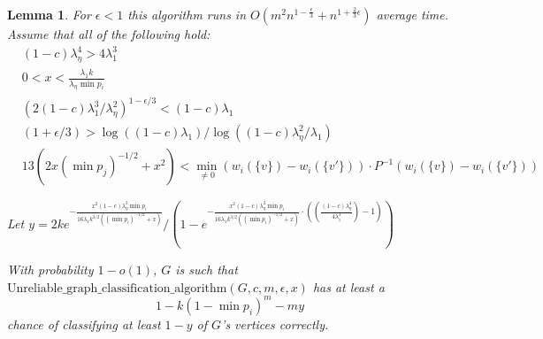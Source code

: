\documentclass[11pt]{article}
\newcommand{\1}{\mathbb{1}}
\newtheorem{lemma}{Lemma}
\begin{document}
\begin{lemma}
For $\epsilon<1$ this algorithm runs in $O(m^2 n^{1-\frac{\epsilon}{3}}+n^{1+\frac{2}{3}\epsilon})$ average time. Assume that all of the following hold:
\begin{align*}
&(1-c)\lambda_{\eta}^4>4\lambda_1^3\\
&0<x<\frac{\lambda_1k}{\lambda_{\eta}\min p_i}\\
&(2(1-c)\lambda_1^3/\lambda_{\eta}^2)^{1-\epsilon/3}<(1-c)\lambda_1\\
&(1+\epsilon/3)>\log((1-c)\lambda_1)/\log ((1-c)\lambda_{\eta}^2/\lambda_1)\\
&13(2x(\min p_j)^{-1/2}+x^2)<\min_{\ne0} (w_i(\{v\})- w_i(\{v'\}))\cdot P^{-1}(w_i(\{v\})- w_i(\{v'\}))
\end{align*}

Let $y=2ke^{-\frac{x^2(1-c)\lambda_{\eta}^2\min p_i}{16\lambda_1k^{3/2}((\min p_i)^{-1/2}+x)}}/\left(1-e^{-\frac{x^2(1-c)\lambda_{\eta}^2\min p_i}{16\lambda_1k^{3/2}((\min p_i)^{-1/2}+x)}\cdot((\frac{(1-c)\lambda_{\eta}^4}{4\lambda_1^3})-1)}\right)$

With probability $1-o(1)$, $G$ is such that $\text{Unreliable\_graph\_classification\_algorithm}(G,c,m,\epsilon,x)$ has at least a \[1-k(1-\min p_i)^m-my\] chance of classifying at least $1-y$ of $G$'s vertices correctly.

\end{lemma}
\end{document}
